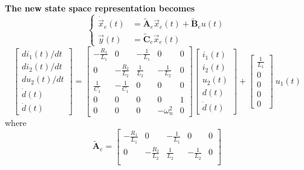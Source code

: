 \documentclass[11pt,a4paper,oneside]{book}
\numberwithin{equation}{section}
\theoremstyle{it}
\theoremstyle{definition}
\begin{document}
\begin{mybox}
	\noindent\textbf{The new state space representation becomes}
	\begin{equation}
		\left\lbrace \begin{aligned}
			\dot{\vec{x}}_e(t) &= \tilde{\mathbf{A}}_e \vec{x}_e(t) + 
			\tilde{\mathbf{B}}_e u(t) \\[6pt]
			{\vec{y}}(t) &= \tilde{\mathbf{C}}_e \vec{x}_e(t)
		\end{aligned}\right. 
	\end{equation}
	\begin{equation}
		\begin{bmatrix}
			di_1(t)/dt \\[6pt]
			di_2(t)/dt \\[6pt]
			du_2(t)/dt \\[6pt]
			\dot{d}(t) \\[6pt]
			\ddot{d}(t)
		\end{bmatrix} =
		\begin{bmatrix}
			-\frac{R_1}{L_1} & 0 & -\frac{1}{L_1} & 0 & 0\\[6pt]
			0 & -\frac{R_2}{L_2} & \frac{1}{L_2} & -\frac{1}{L_2} & 0\\[6pt]
			\frac{1}{C_1} & -\frac{1}{C_1} & 0 & 0 & 0 \\[6pt]
			0 & 0 & 0 & 0 & 1 \\[6pt]
			0 & 0 & 0 & -\omega_n^2 & 0
		\end{bmatrix} 
		\begin{bmatrix}
			i_1(t) \\[6pt]
			i_2(t)\\[6pt]
			u_2(t)\\[6pt]
			d(t) \\[6pt]
			\dot{d}(t)
		\end{bmatrix} + 
		\begin{bmatrix}
			\frac{1}{L_1} \\[6pt]
			0 \\[6pt]
			0 \\[6pt]
			0 \\[6pt]
			0
		\end{bmatrix} \ u_1(t)
	\end{equation}
	where
	\begin{equation*}
		\tilde{\mathbf{A}}_e = 
		\begin{bmatrix}
			-\frac{R_1}{L_1} & 0 & -\frac{1}{L_1} & 0 & 0\\[6pt]
			0 & -\frac{R_2}{L_2} & \frac{1}{L_2} & -\frac{1}{L_2} & 0\\[6pt]

\end{bmatrix}
\end{equation*}
\end{mybox}
\end{document}
